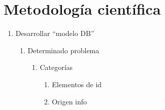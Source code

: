 \section {Metodología científica}
\begin{enumerate}
\item Desarrollar ``modelo DB''
\begin{enumerate}
\item Determinado problema
\begin{enumerate}
\item Categorías
\begin{enumerate}
\item Elementos de id
\item Origen info
\end{enumerate}
\end{enumerate}
\end{enumerate}
\end{enumerate}